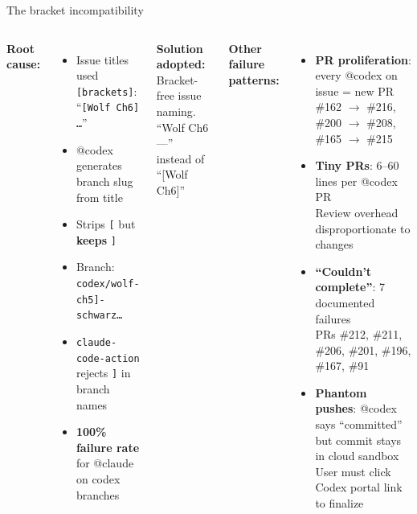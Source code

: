 \documentclass[aspectratio=169,10pt]{beamer}
\begin{document}
\begin{frame}{The bracket incompatibility}
    \vspace{-0.2em}
    \begin{columns}[T]
        \textcolor{softred}{\textbf{Root cause:}}
        \vspace{0.2em}
        \begin{itemize}
            \item Issue titles used \texttt{[brackets]}: ``\texttt{[Wolf Ch6] \ldots}''
            \item @codex generates branch slug from title
            \item Strips \texttt{[} but \textbf{keeps} \texttt{]}
            \item Branch: \texttt{codex/wolf-ch5]-schwarz\ldots}
            \item \texttt{claude-code-action} rejects \texttt{]} in branch names
            \item \textbf{100\% failure rate} for @claude on codex branches
        \end{itemize}
        \vspace{0.3em}
        \textcolor{leangreen}{\textbf{Solution adopted:}} Bracket-free issue naming.\\
        {\scriptsize ``Wolf Ch6 ---'' instead of ``[Wolf Ch6]''}

        \textcolor{softred}{\textbf{Other failure patterns:}}
        \vspace{0.2em}
        \begin{itemize}
            \item \textbf{PR proliferation}: every @codex on issue = new PR\\
              {\scriptsize \#162 $\to$ \#216, \#200 $\to$ \#208, \#165 $\to$ \#215}
            \item \textbf{Tiny PRs}: 6--60 lines per @codex PR\\
              {\scriptsize Review overhead disproportionate to changes}
            \item \textbf{``Couldn't complete''}: 7 documented failures\\
              {\scriptsize PRs \#212, \#211, \#206, \#201, \#196, \#167, \#91}
            \item \textbf{Phantom pushes}: @codex says ``committed'' but commit stays in cloud sandbox\\
              {\scriptsize User must click Codex portal link to finalize}
        \end{itemize}
    \end{columns}
\end{frame}
\end{document}
